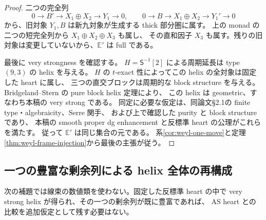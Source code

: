 \begin{proof}
二つの完全列
\[
 0\to B'\to X_1\oplus X_2\to Y_1\to0,
 \qquad
 0\to B\to X_1\oplus X_2\to Y_1'\to0
\]
から、旧対象 $Y_1,B$ は新九対象が生成する thick 部分圏に属す。
上の monad の二つの短完全列から $X_1\oplus X_2\oplus X_3$ も属し、
その直和因子 $X_3$ も属す。残りの旧対象は変更していないから、$\mathbb E'$ は full である。

最後に very strongness を確認する。
$H=\mathsf S^{-1}[2]$ による周期延長は type $(9,3)$ の helix を与える。
$H$ の $t$-exact 性によってこの helix の全対象は固定した heart に属し、
三つの直交ブロックは周期的な block structure を与える。
Bridgeland--Stern\cite[Theorem 5.3(ii)]{BSHelices} の pure block helix 定理により、
この helix は geometric、すなわち本稿の very strong である。
同定に必要な仮定は、同論文\S2.1の finite type・algebraicity、Serre 関手、
および上で確認した purity と block structure であり、
本稿の smooth proper dg enhancement と反標準 heart の公理がこれらを満たす。
従って $\mathbb E'$ は同じ集合の元である。
系\ref{cor:weyl-one-move}と定理\ref{thm:weyl-frame-injection}から最後の主張が従う。
\end{proof}


\subsection{一つの豊富な剰余列による helix 全体の再構成}

次の補題では線束の数値類を使わない。固定した反標準 heart の中で
very strong helix が得られ、その一つの剰余列が既に豊富であれば、
AS heart との比較を追加仮定として残す必要はない。


